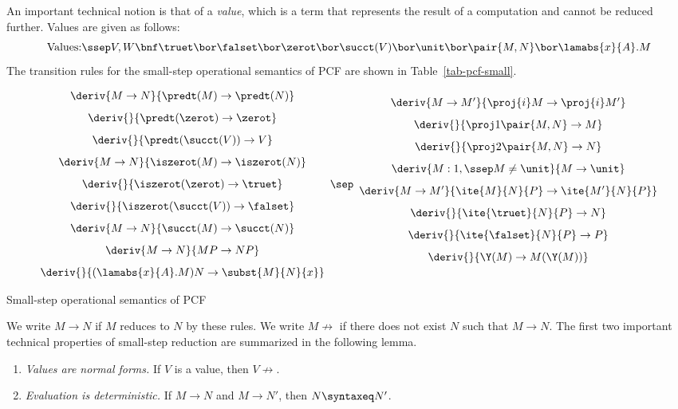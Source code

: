 \documentclass[12pt]{article}
\begin{document}
An important technical notion is that of a {\em value}, which is a
term that represents the result of a computation and cannot be reduced
further. Values are given as follows:
\[ \mbox{Values:}\ssep V,W \bnf \truet \bor \falset \bor \zerot \bor
   \succt(V) \bor \unit \bor \pair{M,N} \bor \lamabs{x}{A}.M
\]
The transition rules for the small-step operational semantics of PCF
are shown in Table~\ref{tab-pcf-small}.
\begin{table*}[t]\def\nl{\\[1.8ex]}
\[
\begin{array}{c}
  \deriv{M\to N}{\predt(M)\to\predt(N)} \nl
  \deriv{}{\predt(\zerot)\to\zerot} \nl
  \deriv{}{\predt(\succt(V))\to V} \nl
  \deriv{M\to N}{\iszerot(M)\to\iszerot(N)} \nl
  \deriv{}{\iszerot(\zerot)\to\truet} \nl
  \deriv{}{\iszerot(\succt(V))\to\falset} \nl
  \deriv{M\to N}{\succt(M)\to\succt(N)} \nl
  \deriv{M\to N}{MP\to NP} \nl
  \deriv{}{(\lamabs{x}{A}.M)N\to \subst{M}{N}{x}}
\end{array}
\sep
\begin{array}{c}
  \deriv{M\to M'}{\proj{i} M\to \proj{i}M'} \nl
  \deriv{}{\proj1\pair{M,N}\to M} \nl
  \deriv{}{\proj2\pair{M,N}\to N} \nl
  \deriv{M:1,\ssep M\neq\unit}{M\to\unit} \nl
  \deriv{M\to M'}{\ite{M}{N}{P}\to\ite{M'}{N}{P}} \nl
  \deriv{}{\ite{\truet}{N}{P}\to N} \nl
  \deriv{}{\ite{\falset}{N}{P}\to P} \nl
  \deriv{}{\Y(M)\to M(\Y(M))} \nl
\end{array}
\]
\caption{Small-step operational semantics of PCF}
\label{tab-pcf-small}
\end{table*}

We write $M\to N$ if $M$ reduces to $N$ by these rules. We write
$M\not\to$ if there does not exist $N$ such that $M\to N$. The first
two important technical properties of small-step reduction are
summarized in the following lemma.

\begin{lemma}\label{lem-pcf-lemma1}
  \begin{enumerate}
  \item {\em Values are normal forms.} If $V$ is a value, then $V\not\to$.
  \item {\em Evaluation is deterministic.} If $M\to N$ and $M\to N'$,
    then $N\syntaxeq N'$.
  \end{enumerate}
\end{lemma}
\end{document}
